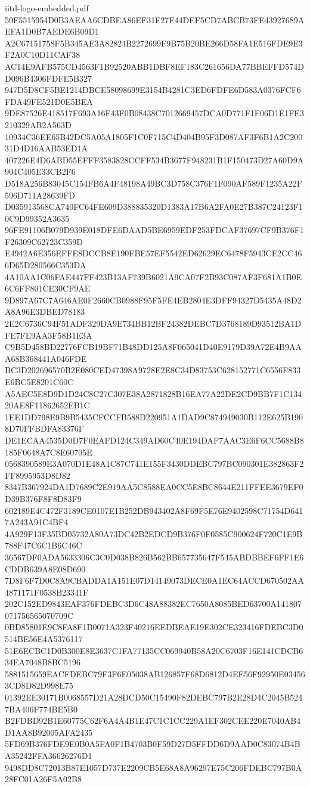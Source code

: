 \begin{filecontents*}[overwrite]{iitd-logo-embedded.pdf}
50F5515954D0B3AEAA6CDBEA86EF31F27F44DEF5CD7ABCB73FE43927689AEFA1D0B7AEDE6B09D1
A2C67151758F5B345AE3A82824B2272699F9B75B20BE266D58FA1E516FDE9E3F2A0C10D11CAF38
AC14E9AFB575CD4563F1B92520ABB1DBF8EF183C261656DA77BBEFFD574DD096B4306FDFE5B327
947D5D8CF5BE1214DBCE58098699E3154B4281C3ED6FDFE6D583A0376FCF6FDA49FE521D0E5BEA
9DE87526E418517F693A16F43F0B08438C7012669457DCA0D771F1F06D1E1FE3210329AB2A563D
10934C36EE65B42DC5A05A1805F1C0F715C4D404B95F3D087AF3F6B1A2C20031D4D16AAB53ED1A
407226E4D6ABD55EFFF3583828CCFF534B3677F948231B1F150473D27A60D9A904C405E33CB2F6
D518A256B83045C154FB6A4F48198A49BC3D758C376F1F090AF589F1235A22F596D711A28639FD
D035913568CA740FC64FE609D388835320D1383A17B6A2FA0E27B387C24123F10C9D99352A3635
96FE91106B079D939E018DFE6DAAD5BE6959EDF253FDCAF37697CF9B376F1F26309C62723C359D
E4942A6E356EFFE8DCCB8E190FBE57EF5542ED62629EC6478F5943CE2CC466D65D280566C353DA
4A10AA1C06FAE447FF423B13AF739B6021A9CA07F2B93C087AF3F681A1B0E6C6FF801CE30CF9AE
9D897A67C7A646AE0F2660CB0988F95F5FE4EB2804E3DFF94327D5435A48D2A8A96E3DBED78183
2E2C6736C94F51ADF329DA9E734BB12BF24382DEBC7D3768189D93512BA1DFE7FE9AA3F58B1E3A
C9B5D458BD22776FCB19BF71B48DD125A8F065041D40E9179D39A72E4B9AAA68B368441A046FDE
BC3D202696570B2E080CED47398A9728E2E8C34D83753C628152771C6556F833E6BC5E8201C60C
A5AEC5E8D9D1D24C8C27C307E38A2871828B16EA77A22DE2CD9BB7F1C13420AE8F11862652EB1C
1EE1DD798E9B9B5435CFCCFB588D220951A1DAD9C874949030B112E625B1908D70FFBDFA83376F
DE1ECAA4535D0D7F0EAFD124C349AD60C40E194DAF7AAC3E6F6CC5688B8185F0648A7C8E60705E
0568390589E3A070D1E48A1C87C741E155F3430DDEBC797BC090301E382863F2FF8995953D8D82
8347B367924DA1D7689C2E919AA5C8588EA0CC5E8BC8644E211FFEE3679EF0D39B376F8F8D83F9
602189E4C472F3189CE0107E1B252DB943402A8F69F5E76E9402598C71754D6417A243A91C4BF4
4A929F13F35BD05732A80A73DC42B2EDCD9B376F0F0585C900624F720C1E9B788F47C6C1B6C46C
36567DF0ADA5633306C3C0D038B826B562BB657735647F545ABDBBEF6FF1E6CDDB639A8E08D690
7D8F6F7D0C8A9CBADDA1A151E07D14149073DECE0A1EC64ACCD670502AA4871171F0538B23341F
202C152ED9843EAF376FDEBC3D6C48A88382EC7650A8085BED63700A141807071756565070709C
0BD85801E9C8FA8F1B0071A323F40216EEDBEAE19E302CE323416FDEBC3D0514BE56E4A5376117
51E6ECBC1D0B300E8E3637C1FA77135CC069940B58A20C6703F16E141CDCB634EA7048B8BC5196
5881515659EACFDEBC79F3F6E05038AB126857F68D6812D4EE56F92950E034563CD8D82D998E75
01392EE30171B0068557D21A28DCD50C15490F82DEBC797B2E28D4C2045B5247BA406F774BE5B0
B2FDBD92B1E60775C62F6A4A4B1E47C1C1CC229A1EF302CEE220E7040AB4D1AA8B92005AFA2435
5FD69B376FDE9E0B0A5FA0F1B4703B0F59D27D5FFDD6D9AAD0C83074B4BA35242FFA36626276D1
9498DD8C72013B87E1057D737E2209CB5E68A8A96297E75C206FDEBC797B0A28FC01A26F5A02B8

\end{filecontents*}
